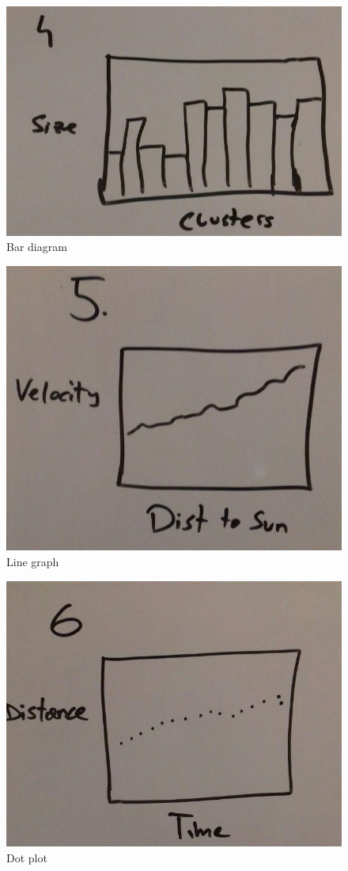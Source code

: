 \documentclass{article}
\begin{document}
\begin{figure}
\includegraphics[width=\textwidth]{SizeClusters.jpg}
	\caption{Bar diagram}
	\label{fig6}
\end{figure}
\begin{figure}
\includegraphics[width=\textwidth]{VelocityDist.jpg}
	\caption{Line graph}
	\label{fig7}
\end{figure}
\begin{figure}
\includegraphics[width=\textwidth]{DistanceTime.jpg}
	\caption{Dot plot}
	\label{fig8}
\end{figure}
\end{document}
